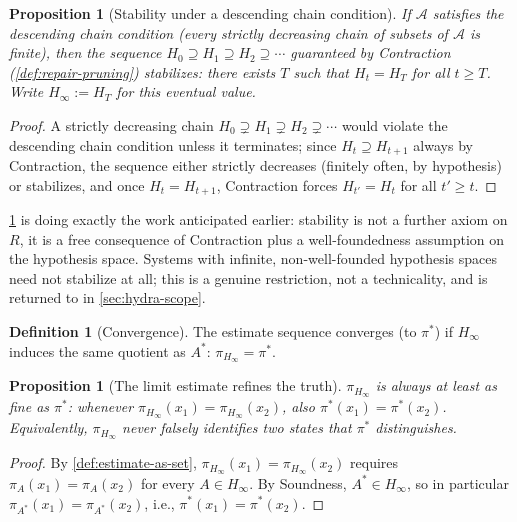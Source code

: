 \documentclass[11pt]{book}
\theoremstyle{plain}
\newtheorem{proposition}[theorem]{Proposition}
\theoremstyle{definition}
\newtheorem{definition}[theorem]{Definition}
\theoremstyle{remark}
\begin{document}
\begin{proposition}[Stability under a descending chain condition]
\label{prop:stability}
If $\mathcal{A}$ satisfies the descending chain condition (every
strictly decreasing chain of subsets of $\mathcal{A}$ is finite), then
the sequence $H_0 \supseteq H_1 \supseteq H_2 \supseteq \cdots$
guaranteed by Contraction (\cref{def:repair-pruning}) stabilizes: there
exists $T$ such that $H_t = H_T$ for all $t \geq T$. Write $H_\infty :=
H_T$ for this eventual value.
\end{proposition}

\begin{proof}
A strictly decreasing chain $H_0 \supsetneq H_1 \supsetneq H_2
\supsetneq \cdots$ would violate the descending chain condition unless
it terminates; since $H_t \supseteq H_{t+1}$ always by Contraction, the
sequence either strictly decreases (finitely often, by hypothesis) or
stabilizes, and once $H_t = H_{t+1}$, Contraction forces $H_{t'} = H_t$
for all $t' \geq t$.
\end{proof}

\cref{prop:stability} is doing exactly the work anticipated earlier:
stability is not a further axiom on $R$, it is a free consequence of
Contraction plus a well-foundedness assumption on the hypothesis space.
Systems with infinite, non-well-founded hypothesis spaces need not
stabilize at all; this is a genuine restriction, not a technicality,
and is returned to in \cref{sec:hydra-scope}.

\begin{definition}[Convergence]
\label{def:convergence}
The estimate sequence converges (to $\pi^*$) if $H_\infty$ induces the
same quotient as $A^*$: $\pi_{H_\infty} = \pi^*$.
\end{definition}

\begin{proposition}[The limit estimate refines the truth]
\label{prop:limit-refines}
$\pi_{H_\infty}$ is always at least as fine as $\pi^*$: whenever
$\pi_{H_\infty}(x_1) = \pi_{H_\infty}(x_2)$, also $\pi^*(x_1) =
\pi^*(x_2)$. Equivalently, $\pi_{H_\infty}$ never falsely identifies
two states that $\pi^*$ distinguishes.
\end{proposition}

\begin{proof}
By \cref{def:estimate-as-set}, $\pi_{H_\infty}(x_1) =
\pi_{H_\infty}(x_2)$ requires $\pi_A(x_1) = \pi_A(x_2)$ for every $A
\in H_\infty$. By Soundness, $A^* \in H_\infty$, so in particular
$\pi_{A^*}(x_1) = \pi_{A^*}(x_2)$, i.e., $\pi^*(x_1) = \pi^*(x_2)$.
\end{proof}
\end{document}
